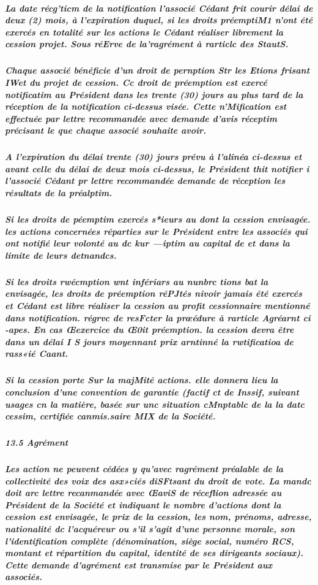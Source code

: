 \documentclass[a4paper, 11pt]{article}
\begin{document}
\subparagraph{
  La date récg'ticm de la notification l'associé Cédant frit courir délai de deux (2) mois, à l'expiration duquel, si les droits préemptiM1 n'ont été exercés en totalité sur les actions le Cédant réaliser librement la cession projet. Sous réErve de la'ragrément à rarticlc des StautS.
}

\subparagraph{
  Chaque associé bénéficie d'un droit de pernption Str les Etions frisant IWet du projet de cession. Cc droit de préemption est exercé notificatim au Président dans les trente (30) jours au plus tard de la réception de la notification ci-dessus visée. Cette n'Mification est effectuée par lettre recommandée avec demande d'avis réceptim précisant le que chaque associé souhaite avoir.
}

\subparagraph{
  A l'expiration du délai trente (30) jours prévu à l'alinéa ci-dessus et avant celle du délai de deux mois ci-dessus, le Président thit notifier i l'associé Cédant pr lettre recommandée demande de réception les résultats de la préalptim.
}

\subparagraph{
  Si les droits de péemptim exercés s*ieurs au dont la cession envisagée. les actions concernées réparties sur le Président entre les associés qui ont notifié leur volonté au dc kur —iptim au capital de et dans la limite de leurs detnandcs.
}

\subparagraph{
  Si les droits rwécmption wnt infériars au nunbrc tions bat la envisagée, les droits de préemption réPJtés nivoir jamais été exercés et Cédant est libre réaliser la cession au profit cessionnaire mentionné dans notification. régrvc de resFcter la prœédure à rarticle Agréarnt  ci -apes.  En cas Œexercice du Œ0it préemption. la cession devra être dans un délai I S jours moyennant prix arntinné la rwtificatioa de rass«ié Caant.
}

\subparagraph{
  Si la cession porte Sur la majMité actions. elle donnera lieu la conclusion d'une convention de garantie (factif ct de Inssif, suivant usages cn la matière, basée sur unc situation cMnptablc de la la datc cessim, certifiée canmis.saire MIX de la Société.
}

\subparagraph{
  13.5 Agrément
}

\subparagraph{
  Les action ne peuvent cédées y qu'avec ragrément préalable de la collectivité des voix des asx»ciés diSFtsant du droit de vote. La mandc doit arc lettre recanmandée avec ŒaviS de réceflion adressée au Président de la Société et indiquant le nombre d'actions dont la cession est envisagée, le prix de la cession, les nom, prénoms, adresse, nationalité dc l'acquéreur ou s'il s'agit d'une personne morale, son l'identification complète (dénomination, siège social, numéro RCS, montant et répartition du capital, identité de ses dirigeants sociaux). Cette demande d'agrément est transmise par le Président aux associés.
}
\end{document}

